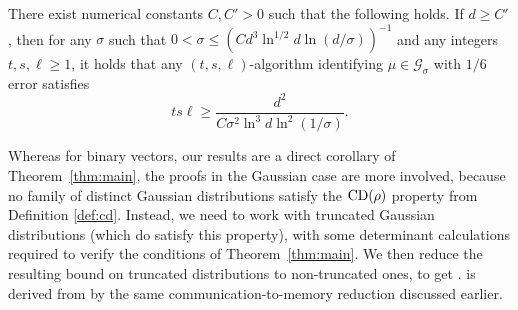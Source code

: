 \begin{theorem} \label{thm:normal-mem}
There exist numerical constants $C,C'>0$ such that the following holds. If $d\geq C'$, then for any $\sigma$ such that $ 0 < \sigma \le \left(C d^{3} \ln^{1/2} d \ln (d/\sigma)\right)^{-1}$ and any integers $t,s, \ell \ge 1$, it holds that any $(t,s,\ell)$-algorithm identifying  $\mu \in \mathcal{G}_\sigma$ with $1/6$ error satisfies
\begin{equation*}
ts\ell \ge \frac{d^2}{C \sigma^2 \ln^3 d \ln^2 (1/\sigma)}.
\end{equation*}
\end{theorem}

Whereas for binary vectors, our results are a direct corollary of Theorem~\ref{thm:main}, the proofs in the Gaussian case are more involved,  because no family of distinct Gaussian distributions satisfy the $\mathrm{CD}(\rho)$ property from Definition \ref{def:cd}. Instead, we need to work with truncated Gaussian distributions (which do satisfy this property), with some determinant calculations required to verify the conditions of Theorem~\ref{thm:main}. We then reduce the resulting bound on truncated distributions to non-truncated ones, to get .  is derived from  by the same communication-to-memory reduction discussed earlier.

